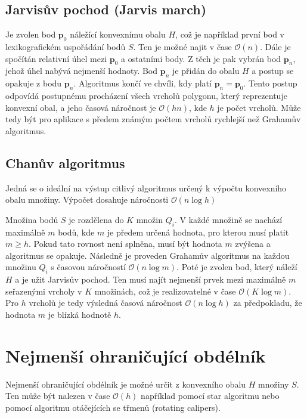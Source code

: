 \documentclass[twoside]{ctuthesis}
\begin{document}
\subsection{Jarvisův pochod (Jarvis march)}
Je zvolen bod $\mathbf{p}_0$ náležící konvexnímu obalu $H$, což je například první bod v lexikografickém uspořádání bodů $S$. Ten je možné najit v čase $\mathcal{O}(n)$. Dále je spočítán relativní úhel mezi $\mathbf{p}_0$ a ostatními body. Z těch je pak vybrán bod $\mathbf{p}_n$, jehož úhel nabývá nejmenší hodnoty. Bod $\mathbf{p}_n$ je přidán do obalu $H$ a postup se opakuje z bodu $\mathbf{p}_n$. Algoritmus končí ve chvíli, kdy platí $\mathbf{p}_n = \mathbf{p}_0$. Tento postup odpovídá postupnému procházení všech vrcholů polygonu, který reprezentuje konvexní obal, a jeho časová náročnost je $\mathcal{O}(hn)$, kde $h$ je počet vrcholů. Může tedy být pro aplikace s předem známým počtem vrcholů rychlejší než Grahamův algoritmus.

\subsection{Chanův algoritmus}
Jedná se o ideální na výstup citlivý algoritmus určený k výpočtu konvexního obalu množiny. Výpočet dosahuje náročnosti $\mathcal{O}(n\log h)$ 

Množina bodů  $S$ je rozdělena do $K$ množin $Q_i$. V každé množině se nachází maximálně $m$ bodů, kde $m$ je předem určená hodnota, pro kterou musí platit $m \geq h$. Pokud tato rovnost není splněna, musí být hodnota $m$ zvýšena a algoritmus se opakuje. Následně je proveden Grahamův algoritmus na každou množinu $Q_i$ s časovou náročností $\mathcal{O}(n\log m)$. Poté je zvolen bod, který náleží $H$ a je užit Jarvisův pochod. Ten musí najít nejmenší prvek mezi maximálně $m$ seřazenými vrcholy v $K$ množinách, což je realizovatelné v čase $\mathcal{O}(K \log m)$. Pro $h$ vrcholů je tedy výsledná časová náročnost $\mathcal{O}(n \log h)$ za předpokladu, že hodnota $m$ je blízká hodnotě $h$.\cite{chan1996optimal}

\section{Nejmenší ohraničující obdélník}
\label{sec:nejmenší_obdélník}
Nejmenší ohraničující obdélník je možné určit z konvexního obalu $H$ množiny $S$. Ten může být nalezen v čase $\mathcal{O}(h)$ například pomocí star algoritmu \cite{toussaint1984complexity} nebo pomocí algoritmu otáčejících se třmenů (rotating calipers).
\end{document}
